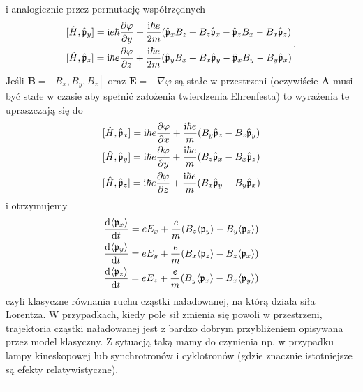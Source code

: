 \documentclass{myclass}
\begin{document}
{\begin{equation*}
\end{equation*}
i analogicznie przez permutację współrzędnych
\begin{equation*}
\begin{split}
&[\hat{H},\hat{\mathfrak{p}}_y]=\mathrm{i} e\hbar\pdv{\varphi}{y}+\frac{\mathrm{i}\hbar e}{2m}(\hat{\mathfrak{p}}_xB_z+B_z\hat{\mathfrak{p}}_x-\hat{\mathfrak{p}}_zB_x-B_x\hat{\mathfrak{p}}_z)\\
&[\hat{H},\hat{\mathfrak{p}}_z]=\mathrm{i}\hbar e\pdv{\varphi}{z}+\frac{\mathrm{i}\hbar e}{2m}(\hat{\mathfrak{p}}_yB_x+B_x\hat{\mathfrak{p}}_y-\hat{\mathfrak{p}}_xB_y-B_y\hat{\mathfrak{p}}_x)
\end{split}\,.
\end{equation*}
Jeśli \(\mathbf{B}=[B_x,B_y,B_z]\) oraz \(\mathbf{E}=-\nabla\varphi\) są stałe w przestrzeni
(oczywiście \(\mathbf{A}\) musi być stałe w czasie aby spełnić założenia twierdzenia Ehrenfesta) to
wyrażenia te upraszczają się do
\begin{equation*}
\begin{split}
    &[\hat{H},\hat{\mathfrak{p}}_x]=\mathrm{i}\hbar e\pdv{\varphi}{x}+\frac{\mathrm{i}\hbar e}{m}(B_y\hat{\mathfrak{p}}_z-B_z\hat{\mathfrak{p}}_y)\\
    &[\hat{H},\hat{\mathfrak{p}}_y]=\mathrm{i}\hbar e\pdv{\varphi}{y}+\frac{\mathrm{i}\hbar e}{m}(B_z\hat{\mathfrak{p}}_x-B_x\hat{\mathfrak{p}}_z)\\
    &[\hat{H},\hat{\mathfrak{p}}_z]=\mathrm{i}\hbar e\pdv{\varphi}{z}+\frac{\mathrm{i}\hbar e}{m}(B_x\hat{\mathfrak{p}}_y-B_y\hat{\mathfrak{p}}_x)
\end{split}
\end{equation*}
i otrzymujemy
\begin{equation*}
\begin{split}
    &\dv[]{\langle\mathfrak{p}_x\rangle}{t}=eE_x+\frac{e}{m}(B_z\langle\mathfrak{p}_y\rangle-B_y\langle\mathfrak{p}_z\rangle)\\
    &\dv[]{\langle\mathfrak{p}_y\rangle}{t}=eE_y+\frac{e}{m}(B_x\langle\mathfrak{p}_z\rangle-B_z\langle\mathfrak{p}_x\rangle)\\
    &\dv[]{\langle\mathfrak{p}_z\rangle}{t}=eE_z+\frac{e}{m}(B_y\langle\mathfrak{p}_x\rangle-B_x\langle\mathfrak{p}_y\rangle)
\end{split}
\end{equation*}
czyli klasyczne równania ruchu cząstki naładowanej, na którą działa siła Lorentza. W przypadkach,
kiedy  pole sił zmienia się powoli w przestrzeni, trajektoria cząstki naładowanej jest z bardzo
dobrym przybliżeniem opisywana przez model klasyczny. Z sytuacją taką mamy do czynienia np. w
przypadku lampy kineskopowej lub synchrotronów i cyklotronów (gdzie znacznie istotniejsze są efekty
relatywistyczne).}\\
\noindent\rule{\columnwidth}{0.5pt}
\end{document}
